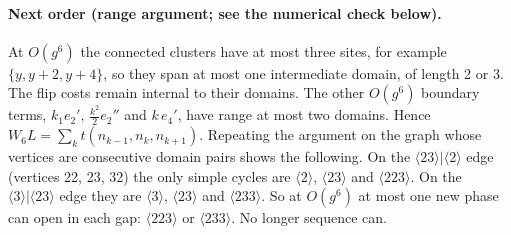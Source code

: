 \paragraph*{Next order (range argument; see the numerical check below).}
At $O(g^6)$ the connected clusters have at most three sites, for example $\{y,y+2,y+4\}$, so they span at most one
intermediate domain, of length 2 or 3. The flip costs remain internal to their domains. The other $O(g^6)$ boundary
terms, $k_1e_2'$, $\tfrac{k^2}{2}e_2''$ and $k\,e_4'$, have range at most two domains. Hence
$W_6L=\sum_k t(n_{k-1},n_k,n_{k+1})$. Repeating the argument on the graph whose vertices are consecutive domain
pairs shows the following. On the $\langle23\rangle|\langle2\rangle$ edge (vertices 22, 23, 32) the only simple
cycles are $\langle2\rangle$, $\langle23\rangle$ and $\langle223\rangle$. On the $\langle3\rangle|\langle23\rangle$
edge they are $\langle3\rangle$, $\langle23\rangle$ and $\langle233\rangle$. So at $O(g^6)$ at most one new phase can
open in each gap: $\langle223\rangle$ or $\langle233\rangle$. No longer sequence can.
